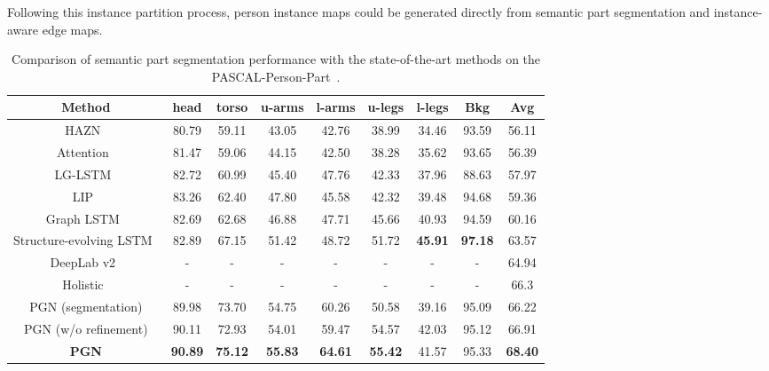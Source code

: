 \documentclass[runningheads]{llncs}
\begin{document}
Following this instance partition process, person instance maps could be generated directly from semantic part segmentation and instance-aware edge maps. 

\begin{table*}[t]
\centering
\small
\caption{Comparison of semantic part segmentation performance with the state-of-the-art methods on the PASCAL-Person-Part~\cite{chen2014detect}.}
\begin{tabular}{ccccccccc}
\toprule[0.7pt]
   Method                                         &  head  &  torso  &  u-arms &  l-arms &  u-legs &  l-legs &  Bkg   &  Avg    \\ \hline
   HAZN~\cite{xia2015zoom}                        & 80.79  &  59.11  &  43.05  &  42.76  &  38.99  &  34.46  &  93.59 &  56.11  \\  
   Attention~\cite{chen2015attention}             & 81.47  &  59.06  &  44.15  &  42.50  &  38.28  &  35.62  &  93.65 &  56.39  \\ 
   LG-LSTM~\cite{liang2015semantic}               & 82.72  &  60.99  &  45.40  &  47.76  &  42.33  &  37.96  &  88.63 &  57.97  \\     
   LIP~\cite{Gong_2017_CVPR}                      & 83.26  &  62.40  &  47.80  &  45.58  &  42.32  &  39.48  &  94.68 &  59.36  \\ 
   Graph LSTM~\cite{liang2016semantic}            & 82.69  &  62.68  &  46.88  &  47.71  &  45.66  &  40.93  &  94.59 &  60.16  \\
   Structure-evolving LSTM~\cite{Liang_2017_CVPR} & 82.89  &  67.15  &  51.42  &  48.72  &  51.72  & \textbf{45.91} & \textbf{97.18} &  63.57  \\
   DeepLab v2~\cite{chen2016deeplab}              &   -    &     -   &   -     &    -    &   -     &    -    &   -    &  64.94  \\
   Holistic~\cite{li2017holistic}                 &   -    &     -   &   -     &    -    &   -     &    -    &   -    &  66.3   \\\hline 
   PGN (segmentation)                             & 89.98  &  73.70  & 54.75   &  60.26  &  50.58  &  39.16  &  95.09 &  66.22  \\
   PGN (w/o refinement)                           & 90.11  &  72.93  & 54.01   &  59.47  &  54.57  &  42.03  &  95.12 &  66.91  \\\hline 
   \textbf{PGN}                               & \textbf{90.89}  &  \textbf{75.12}  &  \textbf{55.83}  &  \textbf{64.61}  &  
                                                  \textbf{55.42}  &  41.57  &  95.33 &  \textbf{68.40}   \\
\toprule[0.7pt]
\end{tabular}
\vspace{-10mm}
\label{tab: pascal}
\end{table*}
\end{document}
